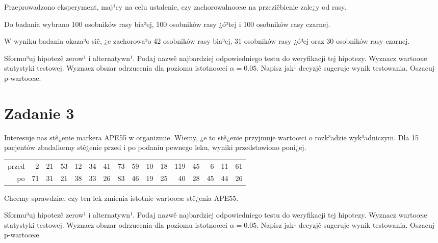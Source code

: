 \documentclass[a4paper,12pt]{article}
\begin{document}
  Przeprowadzono eksperyment, maj¹cy na celu ustalenie, czy zachorowalnoœæ na przeziêbienie zale¿y od rasy.
  
  Do badania wybrano 100 osobników rasy bia³ej, 100 osobników rasy ¿ó³tej i 100 osobników rasy czarnej. 
  
  W wyniku badania okaza³o siê, ¿e zachorowa³o 42 osobników rasy bia³ej, 31 osobników rasy ¿ó³ej oraz 30 osobników rasy czarnej. 
  
  Sformu³uj hipotezê zerow¹ i alternatywn¹. 
  Podaj nazwê najbardziej odpowiedniego testu do weryfikacji tej hipotezy. 
  Wyznacz wartoœæ statystyki testowej. 
  Wyznacz obszar odrzucenia dla poziomu istotnoœci $\alpha=0.05$. 
  Napisz jak¹ decyzjê sugeruje wynik testowania. Oszacuj p-wartoœæ. \vspace{1cm} 

  \section*{Zadanie 3}
     
  Interesuje nas stê¿enie markera APE55  w organizmie. 
  Wiemy, ¿e to stê¿enie przyjmuje wartoœci o rozk³adzie wyk³adniczym. 
  Dla 15 pacjentów zbadaliœmy stê¿enie przed i po podaniu pewnego leku, 
  wyniki przedstawiono poni¿ej.
  
  \vspace{0.5cm} 
  \noindent\begin{center} 
\begin{tabular}{rrrrrrrrrrrrrrrr}
  \hline
  \hline
przed & 2 & 21 & 53 & 12 & 34 & 41 & 73 & 59 & 10 & 18 & 119 & 45 & 6 & 11 & 61 \\
  po & 71 & 31 & 21 & 38 & 33 & 26 & 83 & 46 & 19 & 25 & 40 & 28 & 45 & 44 & 26 \\
   \hline
\end{tabular}
 
  \end{center} 
  \vspace{0.5cm}
  
  Chcemy sprawdziæ, czy ten lek zmienia istotnie wartoœæ stê¿enia APE55.
  
  Sformu³uj hipotezê zerow¹ i alternatywn¹. 
  Podaj nazwê najbardziej odpowiedniego testu do weryfikacji tej hipotezy. 
  Wyznacz wartoœæ statystyki testowej. 
  Wyznacz obszar odrzucenia dla poziomu istotnoœci $\alpha=0.05$. 
  Napisz jak¹ decyzjê sugeruje wynik testowania. Oszacuj p-wartoœæ. \vspace{1cm} 
\end{document}
